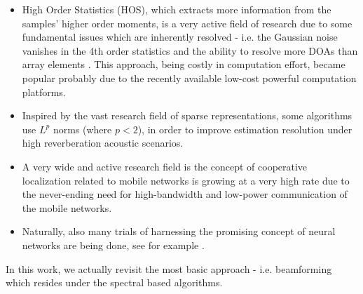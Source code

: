 \begin{itemize}
    \item High Order Statistics (HOS), which extracts more information from the samples' higher order moments, is a very active field of research due to some fundamental issues which are inherently resolved - i.e. the Gaussian noise vanishes in the 4th order statistics and the ability to resolve more DOAs than array elements \cite{chevalier2006high}.
    This approach, being costly in computation effort, became popular probably due to the recently available low-cost powerful computation platforms.
    \item Inspired by the vast research field of sparse representations, some algorithms \cite{nadiri2014localization} use $L^{p}$ norms (where $p<2$), in order to improve estimation resolution under high reverberation acoustic scenarios.
    \item A very wide and active research field is the concept of cooperative localization related to mobile networks is growing at a very high rate due to the never-ending need for high-bandwidth and low-power communication of the mobile networks.
    \item Naturally, also many trials of harnessing the promising concept of neural networks are being done, see for example \cite{shareef2008localization}.
\end{itemize}
In this work, we actually revisit the most basic approach - i.e. beamforming which resides under the spectral based algorithms.